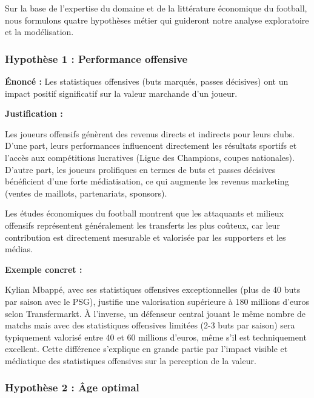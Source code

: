 \documentclass[12pt,a4paper]{article}
\begin{document}
Sur la base de l'expertise du domaine et de la littérature économique du football, nous formulons quatre hypothèses métier qui guideront notre analyse exploratoire et la modélisation.

\subsubsection{Hypothèse 1 : Performance offensive}

\begin{tcolorbox}[colback=lightgray,colframe=maincolor,width=\textwidth,arc=2mm,boxrule=0.8pt]
    \textbf{Énoncé :} Les statistiques offensives (buts marqués, passes décisives) ont un impact positif significatif sur la valeur marchande d'un joueur.
\end{tcolorbox}

\textbf{Justification :}

Les joueurs offensifs génèrent des revenus directs et indirects pour leurs clubs. D'une part, leurs performances influencent directement les résultats sportifs et l'accès aux compétitions lucratives (Ligue des Champions, coupes nationales). D'autre part, les joueurs prolifiques en termes de buts et passes décisives bénéficient d'une forte médiatisation, ce qui augmente les revenus marketing (ventes de maillots, partenariats, sponsors).

Les études économiques du football montrent que les attaquants et milieux offensifs représentent généralement les transferts les plus coûteux, car leur contribution est directement mesurable et valorisée par les supporters et les médias.

\textbf{Exemple concret :}

Kylian Mbappé, avec ses statistiques offensives exceptionnelles (plus de 40 buts par saison avec le PSG), justifie une valorisation supérieure à 180 millions d'euros selon Transfermarkt. À l'inverse, un défenseur central jouant le même nombre de matchs mais avec des statistiques offensives limitées (2-3 buts par saison) sera typiquement valorisé entre 40 et 60 millions d'euros, même s'il est techniquement excellent. Cette différence s'explique en grande partie par l'impact visible et médiatique des statistiques offensives sur la perception de la valeur.

\subsubsection{Hypothèse 2 : Âge optimal}
\end{document}
